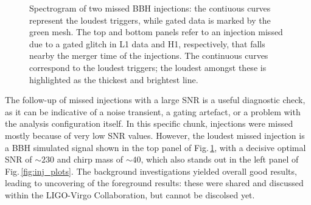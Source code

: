 \documentclass[binding=0.6cm, LaM]{sapthesis}
\begin{document}
        \begin{figure}[t]
          \noindent
          \label{gated}
          \centering
          \caption{Spectrogram of two missed BBH injections: the contiuous curves represent the loudest triggers, while gated data is marked by the green mesh.  The top and bottom panels refer to an injection missed due to a gated glitch in L1 data and H1, respectively, that falls nearby the merger time of the injections. The continuous curves correspond to the loudest triggers; the loudest amongst these is highlighted as the thickest and brightest line.}
          \label{fig:gated}
        \end{figure}

	The follow-up of missed injections with a large SNR is a useful diagnostic check, 
	as it can be indicative of a noise transient, a gating artefact, or a problem with the analysis configuration itself.
	In this specific chunk, injections were missed mostly because of very low SNR values.
	However, the loudest missed injection is a BBH simulated signal shown in the top panel of Fig.\,\ref{fig:gated},
	with a decisive optimal SNR of $\sim 230$ and chirp mass of $\sim 40$,
	which also stands out in the left panel of Fig.\,\ref{fig:inj_plots}.
	The background investigations yielded overall good results,
	leading to uncovering of the foreground results:
	these were shared and discussed within the LIGO-Virgo Collaboration, but cannot be discolsed yet.
\end{document}
